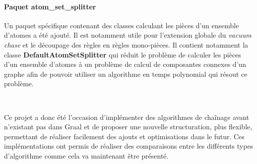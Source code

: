        \paragraph{Paquet atom\_set\_splitter} Un paquet spécifique contenant des classes calculant les pièces d'un ensemble d'atomes a été ajouté. Il est notamment utile pour l'extension globale du \textit{vacuum chase} et le découpage des règles en règles mono-pièces. Il contient notamment la classe \textbf{DefaultAtomSetSplitter} qui réduit le problème de calculer les pièces d'un ensemble d'atomes à un problème de calcul de composantes connexes d'un graphe afin de pouvoir utiliser un algorithme en temps polynomial qui résout ce problème.
       
       \par~\par Ce projet a donc été l'occasion d'implémenter des algorithmes de chaînage avant n'existant pas dans Graal et de proposer une nouvelle structuration, plus flexible, permettant de réaliser facilement des ajouts et optimisations dans le futur. Ces implémentations ont permis de réaliser des comparaisons entre les différents types d'algorithme comme cela va maintenant être présenté.
       
       


